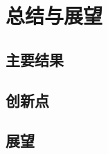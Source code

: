 \begin{conclusion}
\label{参考文献}
\chapter{总结与展望}
\section{主要结果}
\section{创新点}
\section{展望}
\end{conclusion}



